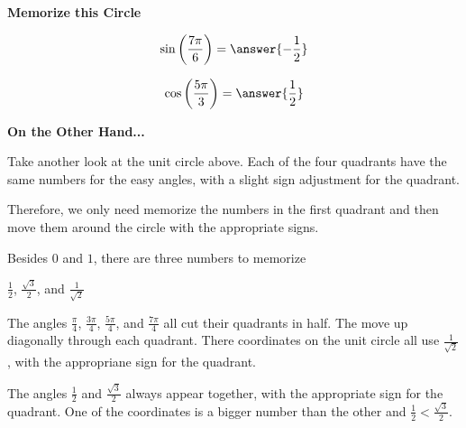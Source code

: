 \documentclass{ximera}
\begin{document}
\begin{center}
\textbf{\textcolor{red!70!black}{Memorize this Circle}}
\end{center}





\begin{question} 


\[
\sin\left( \frac{7\pi}{6} \right) = \answer{-\frac{1}{2}}
\]


\end{question}









\begin{question} 


\[
\cos\left( \frac{5\pi}{3} \right) = \answer{\frac{1}{2}}
\]


\end{question}












\textbf{\textcolor{blue!55!black}{On the Other Hand...}}


Take another look at the unit circle above. Each of the four quadrants have the same numbers for the easy angles, with a slight sign adjustment for the quadrant.

Therefore, we only need memorize the numbers in the first quadrant and then move them around the circle with the appropriate signs.

Besides $0$ and $1$, there are three numbers to memorize


\begin{center}
$\frac{1}{2}$, $\frac{\sqrt{3}}{2}$, and $\frac{1}{\sqrt{2}}$
\end{center}


The angles $\frac{\pi}{4}$, $\frac{3\pi}{4}$, $\frac{5\pi}{4}$, and $\frac{7\pi}{4}$ all cut their quadrants in half.  The move up diagonally through each quadrant.  There coordinates on the unit circle all use $\frac{1}{\sqrt{2}}$, with the appropriane sign for the quadrant.

The angles $\frac{1}{2}$ and $\frac{\sqrt{3}}{2}$ always appear together, with the appropriate sign for the quadrant. One of the coordinates is a bigger number than the other and $\frac{1}{2} < \frac{\sqrt{3}}{2}$.  
\end{document}
